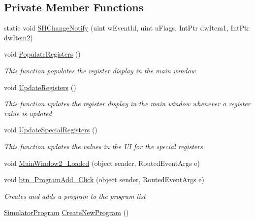 \subsection*{Private Member Functions}
\begin{DoxyCompactItemize}
\item 
static void \hyperlink{class_c_p_u___o_s___simulator_1_1_main_window_a0bbdb2d3b0e818f2d264770168521059}{S\+H\+Change\+Notify} (uint w\+Event\+Id, uint u\+Flags, Int\+Ptr dw\+Item1, Int\+Ptr dw\+Item2)
\item 
void \hyperlink{class_c_p_u___o_s___simulator_1_1_main_window_a06b2ba04e8c006037cae7b0e40b9c5a0}{Populate\+Registers} ()
\begin{DoxyCompactList}\small\item\em This function populates the register display in the main window \end{DoxyCompactList}\item 
void \hyperlink{class_c_p_u___o_s___simulator_1_1_main_window_a4fbca2d50698a847da4ab82c3f380680}{Update\+Registers} ()
\begin{DoxyCompactList}\small\item\em This function updates the register display in the main window whenever a register value is updated \end{DoxyCompactList}\item 
void \hyperlink{class_c_p_u___o_s___simulator_1_1_main_window_a798838ad3fae6117c8e624047a591931}{Update\+Special\+Registers} ()
\begin{DoxyCompactList}\small\item\em This function updates the values in the U\+I for the special registers \end{DoxyCompactList}\item 
void \hyperlink{class_c_p_u___o_s___simulator_1_1_main_window_a3b945b691332686989cd5b5107f7f98b}{Main\+Window2\+\_\+\+Loaded} (object sender, Routed\+Event\+Args e)
\item 
void \hyperlink{class_c_p_u___o_s___simulator_1_1_main_window_abe3e79941789134ce080390fcafc720e}{btn\+\_\+\+Program\+Add\+\_\+\+Click} (object sender, Routed\+Event\+Args e)
\begin{DoxyCompactList}\small\item\em Creates and adds a program to the program list \end{DoxyCompactList}\item 
\hyperlink{class_c_p_u___o_s___simulator_1_1_c_p_u_1_1_simulator_program}{Simulator\+Program} \hyperlink{class_c_p_u___o_s___simulator_1_1_main_window_a4cb75cfa224757b1dc708b60681ad803}{Create\+New\+Program} ()

\end{DoxyCompactItemize}
